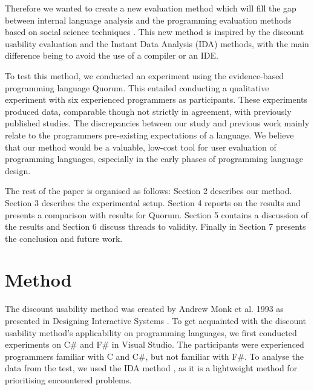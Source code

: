 \documentclass[preprint,10pt]{sigplanconf}
\begin{document}
Therefore we wanted to create a new evaluation method which will fill the gap between 
internal language analysis and the programming evaluation methods based on social science techniques \cite{AliceCS1}\cite{BlockOrNot}\cite{FromScratch}. This new method is inspired by the discount usability evaluation and the Instant Data Analysis (IDA) methods, with the main difference being to avoid the use of a compiler or an IDE. 

To test this method, we conducted an experiment using the evidence-based programming language Quorum. This entailed conducting a qualitative experiment with six experienced programmers as participants. These experiments 
produced data, comparable though not strictly in agreement, with previously published studies. The discrepancies between our study and previous work mainly relate to the programmers pre-existing expectations of a language. 
We believe that our method would be a valuable, low-cost tool for user evaluation of programming languages, especially in the early phases of programming language design.


The rest of the paper is organised as follows: Section 2 describes our method. Section 3 describes the experimental setup. Section 4 reports on the results and presents a comparison with results for Quorum. 
Section 5 contains a discussion of the results and Section 6 discuss threads to validity.
Finally in Section 7 presents the conclusion and future work.


\section{Method}
The discount usability method was created by Andrew Monk et al. 1993 as presented in Designing Interactive Systems \cite{CooperativeEval}.
To get acquainted with the discount usability method’s applicability on programming languages, we first conducted experiments on C\# and F\# in Visual Studio. The participants were experienced programmers familiar with C and C\#, but not familiar with F\#.  To analyse the data from the test, we used the IDA method \cite{IDA}, as it is a lightweight method for prioritising encountered problems.
\end{document}
